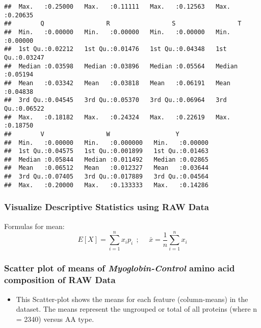 \documentclass[]{article}
\providecommand{\tightlist}{%
  \setlength{\itemsep}{0pt}\setlength{\parskip}{0pt}}
\begin{document}
\begin{verbatim}
##  Max.   :0.25000   Max.   :0.11111   Max.   :0.12563   Max.   :0.20635  
##        Q                 R                 S                 T          
##  Min.   :0.00000   Min.   :0.00000   Min.   :0.00000   Min.   :0.00000  
##  1st Qu.:0.02212   1st Qu.:0.01476   1st Qu.:0.04348   1st Qu.:0.03247  
##  Median :0.03598   Median :0.03896   Median :0.05564   Median :0.05194  
##  Mean   :0.03342   Mean   :0.03818   Mean   :0.06191   Mean   :0.04838  
##  3rd Qu.:0.04545   3rd Qu.:0.05370   3rd Qu.:0.06964   3rd Qu.:0.06522  
##  Max.   :0.18182   Max.   :0.24324   Max.   :0.22619   Max.   :0.18750  
##        V                 W                  Y          
##  Min.   :0.00000   Min.   :0.000000   Min.   :0.00000  
##  1st Qu.:0.04575   1st Qu.:0.001899   1st Qu.:0.01463  
##  Median :0.05844   Median :0.011492   Median :0.02865  
##  Mean   :0.06512   Mean   :0.012327   Mean   :0.03644  
##  3rd Qu.:0.07405   3rd Qu.:0.017889   3rd Qu.:0.04564  
##  Max.   :0.20000   Max.   :0.133333   Max.   :0.14286
\end{verbatim}

\hypertarget{visualize-descriptive-statistics-using-raw-data}{%
\subsubsection{Visualize Descriptive Statistics using RAW
Data}\label{visualize-descriptive-statistics-using-raw-data}}

Formulas for mean: \begin{equation} 
E[X] = \sum_{i=1}^n x_i p_i ~~; ~~~~~~ \bar x = \frac {1}{n} \sum_{i=1}^n x_i
\end{equation}

\hypertarget{scatter-plot-of-means-of-myoglobin-control-amino-acid-composition-of-raw-data}{%
\subsubsection{\texorpdfstring{Scatter plot of means of
\emph{Myoglobin-Control} amino acid composition of RAW
Data}{Scatter plot of means of Myoglobin-Control amino acid composition of RAW Data}}\label{scatter-plot-of-means-of-myoglobin-control-amino-acid-composition-of-raw-data}}

\begin{itemize}
\tightlist
\item
  This Scatter-plot shows the means for each feature (column-means) in
  the dataset. The means represent the ungrouped or total of all
  proteins (where n = 2340) versus AA type.
\end{itemize}
\end{document}
